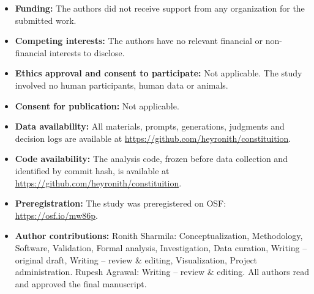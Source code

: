 \begin{itemize}
\item \textbf{Funding:} The authors did not receive support from any organization for the submitted work.
\item \textbf{Competing interests:} The authors have no relevant financial or non-financial interests to disclose.
\item \textbf{Ethics approval and consent to participate:} Not applicable. The study involved no human participants, human data or animals.
\item \textbf{Consent for publication:} Not applicable.
\item \textbf{Data availability:} All materials, prompts, generations, judgments and decision logs are available at \url{https://github.com/heyronith/constituition}.
\item \textbf{Code availability:} The analysis code, frozen before data collection and identified by commit hash, is available at \url{https://github.com/heyronith/constituition}.
\item \textbf{Preregistration:} The study was preregistered on OSF: \url{https://osf.io/mw86p}.
\item \textbf{Author contributions:} Ronith Sharmila: Conceptualization, Methodology, Software, Validation, Formal analysis, Investigation, Data curation, Writing -- original draft, Writing -- review \& editing, Visualization, Project administration. Rupesh Agrawal: Writing -- review \& editing. All authors read and approved the final manuscript.
\end{itemize}
